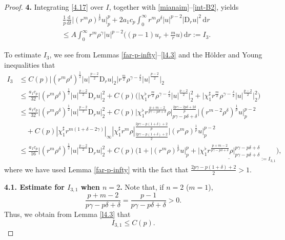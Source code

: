 \documentclass[11pt,reqno]{amsart}
\numberwithin{rk}{section}
\numberwithin{prop}{section}
\numberwithin{mydef}{section}
\numberwithin{lem}{section}
\numberwithin{equation}{section}
\numberwithin{thm}{section}
\begin{document}
\begin{proof}
\smallskip
\textbf{4.} Integrating \eqref{4.17} over $I$, together with \eqref{mianaim}--\eqref{int-B2}, yields 
\begin{equation}\label{add}
\begin{aligned}
&\,\frac{1}{p} \frac{\mathrm{d}}{\mathrm{d}t}\big|(r^m\rho)^{\frac{1}{p}} u\big|_{p}^{p} +2a_1 c_p\int_0^\infty r^m \rho^\delta |u|^{p-2}|\mathrm{D}_r u|^2\,\mathrm{d}r\\
&\leq A\int_0^\infty r^m\rho^\gamma |u|^{p-2}\big((p-1)u_r+\frac{m}{r}u\big)\,\mathrm{d}r:=I_3.
\end{aligned}
\end{equation}

To estimate $I_3$, we see from Lemmas \ref{far-p-infty}--\ref{l4.3} and the H\"older and Young inequalities that
\begin{equation}\label{J1}
\begin{aligned}
I_3&\leq C(p)\big|(r^m\rho^\delta)^{\frac12}|u|^{\frac{p-2}{2}}\mathrm{D}_r u\big|_2\big|r^{\frac{m}{2}}\rho^{\gamma-\frac{\delta}{2}}|u|^{\frac{p-2}{2}}\big|_2\\
&\leq \frac{a_1 c_p}{32}\big|(r^m\rho^\delta)^{\frac12}|u|^{\frac{p-2}{2}}\mathrm{D}_r u\big|_2^2+C(p)\big(\big|\chi_1^\flat r^{\frac{m}{2}}\rho^{\gamma-\frac{\delta}{2}}|u|^{\frac{p-2}{2}}\big|_2^2+ \big|\chi_1^\sharp r^{\frac{m}{2}}\rho^{\gamma-\frac{\delta}{2}}|u|^{\frac{p-2}{2}}\big|_2^2\big)\\
&\leq  \frac{a_1 c_p}{32}\big|(r^m\rho^\delta)^{\frac12}|u|^{\frac{p-2}{2}}\mathrm{D}_r u\big|_2^2+C(p)\big|\chi_1^\flat r^\frac{p+m-2}{p\gamma-p\delta+\delta} \rho\big|_{p\gamma-p\delta+\delta}^\frac{2p\gamma-2p\delta+2\delta}{p}\big|(r^{m-2}\rho^\delta)^\frac{1}{p}u\big|_{p}^{p-2}\\
&\quad +C(p)|\chi_1^\sharp r^{m(1+\delta-2\gamma)}|_\infty |\chi_1^\sharp r^m\rho|_{\frac{2p\gamma-p(1+\delta)+2}{2}}^\frac{2p\gamma-p(1+\delta)+2}{p} \big|(r^m\rho)^\frac{1}{p}u\big|_{p}^{p-2}\\
&\leq \frac{a_1 c_p}{16}\big|(r^m\rho^\delta)^{\frac12}|u|^{\frac{p-2}{2}}\mathrm{D}_r u\big|_2^2+C(p)\Big(1+\big|(r^m\rho)^\frac{1}{p}u\big|_{p}^{p}+\underline{\big|\chi_1^\flat r^\frac{p+m-2}{p\gamma-p\delta+\delta} \rho\big|_{p\gamma-p\delta+\delta}^{p\gamma-p\delta+\delta}}_{:=I_{3,1}}\Big),
\end{aligned}
\end{equation}
where we have used Lemma \ref{far-p-infty} with the fact that $\frac{2p\gamma-p(1+\delta)+2}{2}>1$. 

\smallskip
\textbf{4.1. Estimate for $I_{3,1}$ when $n=2$.} Note that, if $n=2$ ($m=1$),
\begin{equation*}
\frac{p+m-2}{p\gamma-p\delta+\delta}=\frac{p-1}{p\gamma-p\delta+\delta}>0.
\end{equation*}
Thus, we obtain from Lemma \ref{l4.3} that
\begin{equation}\label{g1,1-1}
I_{3,1} \leq C(p).
\end{equation}




\end{proof}
\end{document}
